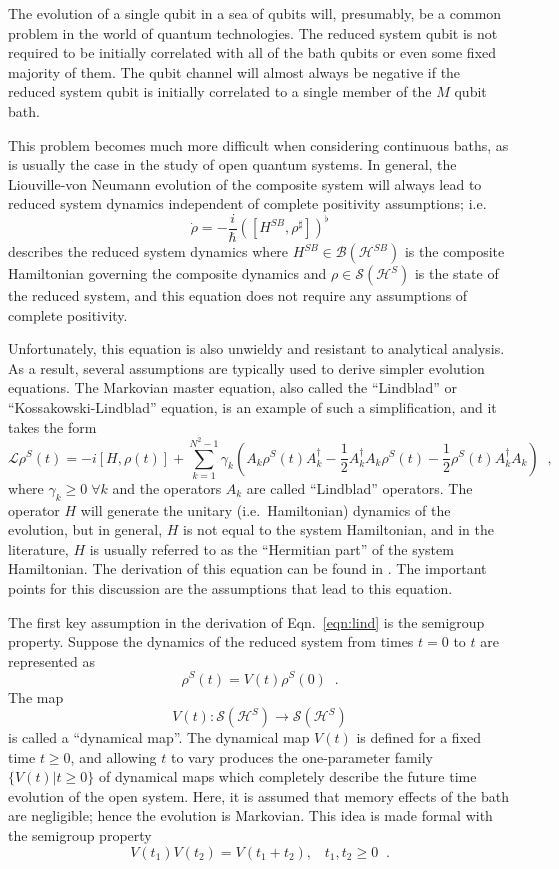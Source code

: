 The evolution of a single qubit in a sea of qubits will, presumably, be a common problem in the world of quantum technologies.  The reduced system qubit is not required to be initially correlated with all of the bath qubits or even some fixed majority of them.  The qubit channel will almost always be negative if the reduced system qubit is initially correlated to a single member of the $M$ qubit bath.  

This problem becomes much more difficult when considering continuous baths, as is usually the case in the study of open quantum systems.  In general, the Liouville-von Neumann evolution of the composite system will always lead to reduced system dynamics independent of complete positivity assumptions; i.e.\
$$
\dot{\rho} = -\frac{i}{\hbar} \left([H^{SB},\rho^\sharp]\right)^\flat
$$
describes the reduced system dynamics where $H^{SB}\in\mathcal{B}(\mathcal{H}^{SB})$ is the composite Hamiltonian governing the composite dynamics and $\rho\in\mathcal{S}(\mathcal{H}^S)$ is the state of the reduced system, and this equation does not require any assumptions of complete positivity.  

Unfortunately, this equation is also unwieldy and resistant to analytical analysis.  As a result, several assumptions are typically used to derive simpler evolution equations.  The Markovian master equation, also called the ``Lindblad'' or ``Kossakowski-Lindblad'' equation, is an example of such a simplification, and it takes the form  
\begin{equation}
\label{eqn:lind}
\mathcal{L}\rho^S(t) = -i[H,\rho(t)] + \sum_{k=1}^{N^2-1} \gamma_k \left( A_k\rho^S(t) A_k^\dagger - \frac{1}{2}A_k^\dagger A_k\rho^S(t) - \frac{1}{2} \rho^S(t)A_k^\dagger A_k\right)\;\;,
\end{equation}
where $\gamma_k\ge 0\;\forall k$ and the operators $A_k$ are called ``Lindblad'' operators.  The operator $H$ will generate the unitary (i.e.\ Hamiltonian) dynamics of the evolution, but in general, $H$ is not equal to the system Hamiltonian, and in the literature, $H$ is usually referred to as the ``Hermitian part'' of the system Hamiltonian.  The derivation of this equation can be found in \cite{Breuer2007}.  The important points for this discussion are the assumptions that lead to this equation.

The first key assumption in the derivation of Eqn.\ \ref{eqn:lind} is the semigroup property.  Suppose the dynamics of the reduced system from times $t=0$ to $t$ are represented as
$$
\rho^S(t) = V(t)\rho^S(0)\;\;. 
$$
The map 
$$
V(t) : \mathcal{S}(\mathcal{H}^S) \rightarrow \mathcal{S}(\mathcal{H}^S)
$$
is called a ``dynamical map''.  The dynamical map $V(t)$ is defined for a fixed time $t\ge0$, and allowing $t$ to vary produces the one-parameter family $\{V(t)|t\ge0\}$ of dynamical maps which completely describe the future time evolution of the open system.  Here, it is assumed that memory effects of the bath are negligible; hence the evolution is Markovian.  This idea is made formal with the semigroup property
$$
V(t_1)V(t_2) = V(t_1+t_2),\;\;\;t_1,t_2\ge0\;\;.
$$

